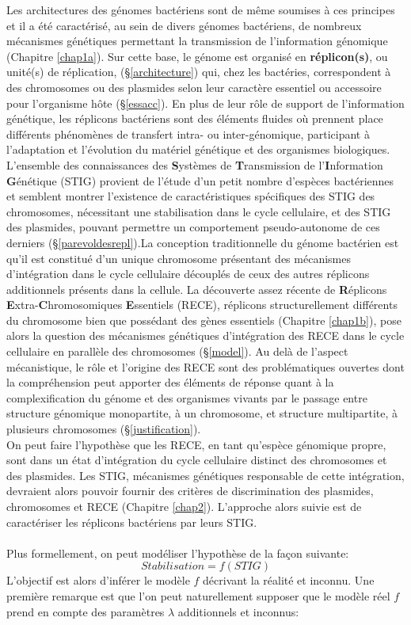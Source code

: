 Les architectures des génomes bactériens sont de même soumises à ces principes et il a été caractérisé, au sein de divers génomes bactériens, de nombreux mécanismes génétiques permettant la transmission de l'information génomique (Chapitre \ref{chap1a}). Sur cette base, le génome est organisé en \textbf{réplicon(s)}, ou unité(s) de réplication, (\S \ref{architecture}) qui, chez les bactéries,  correspondent à des chromosomes ou des plasmides selon leur caractère essentiel ou accessoire pour l'organisme hôte (\S \ref{essacc}). En plus de leur rôle de support de l'information génétique, les réplicons bactériens sont des éléments fluides où prennent place différents phénomènes de transfert intra- ou inter-génomique, participant à l'adaptation et l'évolution du matériel génétique et des organismes biologiques. \\
L'ensemble des connaissances des \textbf{S}ystèmes de \textbf{T}ransmission de l'\textbf{I}nformation \textbf{G}énétique (STIG) provient de l'étude d'un petit nombre d'espèces bactériennes et semblent montrer l'existence de caractéristiques spécifiques des STIG des chromosomes, nécessitant une stabilisation dans le cycle cellulaire, et des STIG des plasmides, pouvant permettre un comportement pseudo-autonome de ces derniers (\S \ref{parevoldesrepl}).La conception traditionnelle du génome bactérien est qu'il est constitué d'un unique chromosome présentant des mécanismes d'intégration dans le cycle cellulaire découplés de ceux des autres réplicons additionnels présents dans la cellule. La découverte assez récente de \textbf{R}éplicons \textbf{E}xtra-\textbf{C}hromosomiques \textbf{E}ssentiels (RECE), réplicons structurellement différents du chromosome bien que possédant des gènes essentiels (Chapitre \ref{chap1b}), pose alors la question des mécanismes génétiques d'intégration des RECE dans le cycle cellulaire en parallèle des chromosomes (\S\ref{model}). Au delà de l'aspect mécanistique, le rôle et l'origine des RECE sont des problématiques ouvertes dont la compréhension peut apporter des éléments de réponse quant à la complexification du génome et des organismes vivants par le passage entre structure génomique monopartite, à un chromosome, et  structure multipartite, à plusieurs chromosomes (\S\ref{justification}).\\
On peut faire l'hypothèse que les RECE, en tant qu'espèce génomique propre, sont dans un état d'intégration du cycle cellulaire distinct des chromosomes et des plasmides. Les STIG, mécanismes génétiques responsable de cette intégration, devraient alors pouvoir fournir des critères de discrimination des plasmides, chromosomes et RECE (Chapitre \ref{chap2}). L'approche alors suivie est de caractériser les réplicons bactériens par leurs STIG. 
\\
\\
Plus formellement, on peut modéliser l'hypothèse de la façon suivante:
$$
Stabilisation = f(STIG)
$$
L'objectif est alors d'inférer le modèle $f$ décrivant la réalité et inconnu. Une première remarque est que l'on peut naturellement supposer que le modèle réel $f$ prend en compte des paramètres $\lambda$ additionnels et inconnus: 


